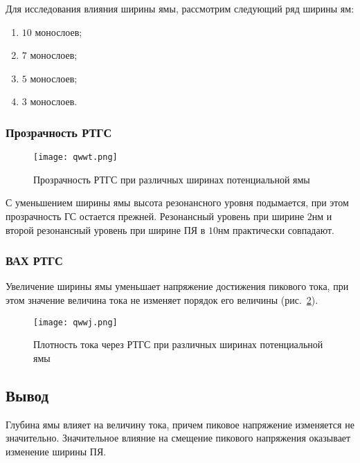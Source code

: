 Для исследования влияния ширины ямы, рассмотрим следующий ряд ширины ям:
\begin{enumerate}
	\item $10$ монослоев;
	\item $7$ монослоев;
	\item $5$ монослоев;
	\item $3$ монослоев.
\end{enumerate}

\subsubsection{Прозрачность РТГС}
\begin{figure}[h!]
	\centering
	\texttt{[image: qwwt.png]}
	\caption{Прозрачность РТГС при различных ширинах потенциальной ямы}
	\label{fig:qwwt}
\end{figure}

С уменьшением ширины ямы высота резонансного уровня подымается, при этом прозрачность ГС остается прежней. Резонансный уровень при ширине $2$нм и второй резонансный уровень при ширине ПЯ в $10$нм практически совпадают. 
\subsubsection{ВАХ РТГС}
Увеличение ширины ямы уменьшает напряжение достижения пикового тока, при этом значение величина тока не изменяет порядок его величины (рис.~\ref{fig:qwwj}).

\begin{figure}[h!]
	\centering
	\texttt{[image: qwwj.png]}
	\caption{Плотность тока через РТГС при различных ширинах потенциальной ямы}
	\label{fig:qwwj}
\end{figure}

\subsection{Вывод}

Глубина ямы влияет на величину тока, причем пиковое напряжение изменяется не значительно. Значительное влияние на смещение пикового напряжения оказывает изменение ширины ПЯ.
